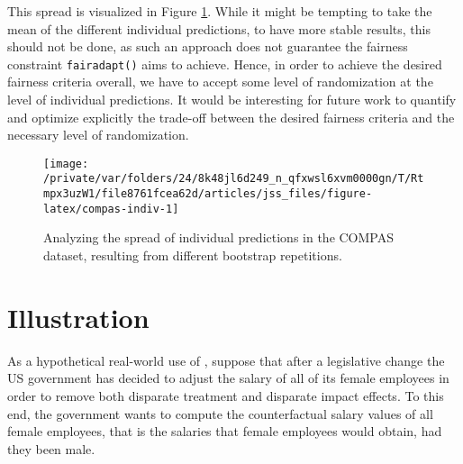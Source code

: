 \documentclass[
  nojss]{jss}
\begin{document}
\begin{CodeChunk}
\end{CodeChunk}

This spread is visualized in Figure \ref{fig:compas-indiv}. While it
might be tempting to take the mean of the different individual
predictions, to have more stable results, this should not be done, as
such an approach does not guarantee the fairness constraint
\texttt{fairadapt()} aims to achieve. Hence, in order to achieve the
desired fairness criteria overall, we have to accept some level of
randomization at the level of individual predictions. It would be
interesting for future work to quantify and optimize explicitly the
trade-off between the desired fairness criteria and the necessary level
of randomization.

\begin{CodeChunk}
\begin{figure}

{\centering \texttt{[image: /private/var/folders/24/8k48jl6d249\_n\_qfxwsl6xvm0000gn/T/Rtmpx3uzW1/file8761fcea62d/articles/jss\_files/figure-latex/compas-indiv-1]} 

}

\caption[Analyzing the spread of individual predictions in the COMPAS dataset, resulting from different bootstrap repetitions]{Analyzing the spread of individual predictions in the COMPAS dataset, resulting from different bootstrap repetitions.}\label{fig:compas-indiv}
\end{figure}
\end{CodeChunk}

\hypertarget{illustration}{%
\section{Illustration}\label{illustration}}

As a hypothetical real-world use of , suppose that after
a legislative change the US government has decided to adjust the salary
of all of its female employees in order to remove both disparate
treatment and disparate impact effects. To this end, the government
wants to compute the counterfactual salary values of all female
employees, that is the salaries that female employees would obtain, had
they been male.
\end{document}
